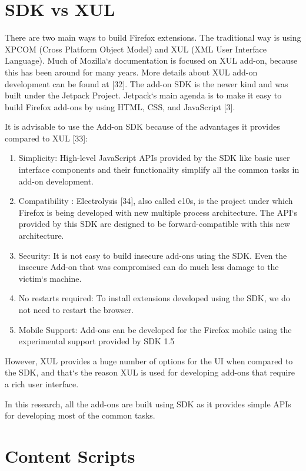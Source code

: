 \section{SDK vs XUL} 

There are two main ways to build Firefox extensions. The traditional way is using XPCOM (Cross Platform Object Model) and XUL (XML User Interface Language). Much of Mozilla`s documentation is focused on XUL add-on, because this has been around for many years. More details about XUL add-on development can be found at [32]. The add-on SDK is the newer kind and was built under the Jetpack Project. Jetpack`s main agenda is to make it easy to build Firefox add-ons by using HTML, CSS, and JavaScript [3].

It is advisable to use the Add-on SDK because of the advantages it provides compared to XUL [33]:

\begin{enumerate}
\item Simplicity: High-level JavaScript APIs provided by the SDK like basic user interface components and their functionality simplify all the common tasks in add-on development. 
\item Compatibility : Electrolysis [34], also called e10s, is the project under which Firefox is being developed with new multiple process architecture. The API`s provided by this SDK are designed to be forward-compatible with this new architecture. 
\item Security: It is not easy to build insecure add-ons using the SDK. Even the insecure Add-on that was compromised can do much less damage to the victim`s machine.
\item No restarts required: To install extensions developed using the SDK, we do not need to restart the browser.
\item Mobile Support: Add-ons can be developed for the Firefox mobile using the experimental support provided by SDK 1.5
\end{enumerate}

However, XUL provides a huge number of options for the UI when compared to the SDK, and that`s the reason XUL is used for developing add-ons that require a rich user interface.

In this research, all the add-ons are built using SDK as it provides simple APIs for developing most of the common tasks.

\section{Content Scripts}

